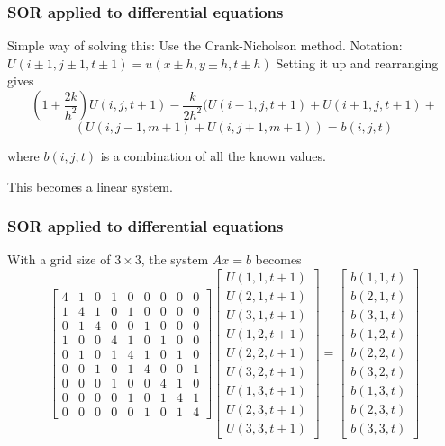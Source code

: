 \begin{frame}
\frametitle{SOR applied to differential equations}
Simple way of solving this: Use the Crank-Nicholson method. Notation: $U(i\pm 1,j\pm 1,t\pm 1)=u(x\pm h,y \pm h,t \pm h)$
Setting it up and rearranging gives
$$
(1+\frac{2k}{h^2})U(i,j,t+1)-\frac{k}{2h^2}(U(i-1,j,t+1)+U(i+1,j,t+1) + $$
$$(U(i,j-1,m+1) + U(i,j+1,m+1)) = b(i,j,t)
$$

where $b(i,j,t)$ is a combination of all the known values.

This becomes a linear system.

\end{frame}

\begin{frame}
\frametitle{SOR applied to differential equations}
With a grid size of $3\times 3$, the system 
$Ax=b$ becomes
$$
\left[
\begin{array}{ccccccccc}
4 & 1 & 0 & 1 & 0 & 0 & 0 & 0 & 0\\
1 & 4 & 1 & 0 & 1 & 0 & 0 & 0 & 0\\
0 & 1 & 4 & 0 & 0 & 1 & 0 & 0 & 0\\
1 & 0 & 0 & 4 & 1 & 0 & 1 & 0 & 0\\
0 & 1 & 0 & 1 & 4 & 1 & 0 & 1 & 0\\
0 & 0 & 1 & 0 & 1 & 4 & 0 & 0 & 1\\
0 & 0 & 0 & 1 & 0 & 0 & 4 & 1 & 0\\
0 & 0 & 0 & 0 & 1 & 0 & 1 & 4 & 1\\
0 & 0 & 0 & 0 & 0 & 1 & 0 & 1 & 4
\end{array}
\right]
\left[
\begin{array}{c}
U(1,1,t+1) \\
U(2,1,t+1) \\
U(3,1,t+1) \\
U(1,2,t+1) \\
U(2,2,t+1) \\
U(3,2,t+1) \\
U(1,3,t+1) \\
U(2,3,t+1) \\
U(3,3,t+1) 
\end{array}
\right]
=
\left[
\begin{array}{c}
b(1,1,t) \\
b(2,1,t) \\
b(3,1,t) \\
b(1,2,t) \\
b(2,2,t) \\
b(3,2,t) \\
b(1,3,t) \\
b(2,3,t) \\
b(3,3,t) 
\end{array}
\right]
$$
\end{frame}

